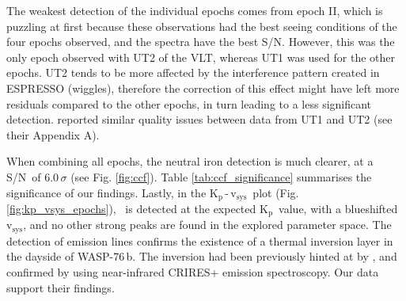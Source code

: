 \documentclass{aa}
\newcommand{\feI}{\ion{Fe}{i}}
\newcommand{\snr}{S/N}
\newcommand{\planet}{WASP-76\,b}
\newcommand{\vsys}{v$_\mathrm{sys}$}
\newcommand{\kpvsys}{K$_\mathrm{p}$\,-\,v$_\mathrm{sys}$}
\newcommand{\kp}{K$_\mathrm{p}$}
\begin{document}
The weakest detection of the individual epochs comes from epoch II, which is puzzling at first because these observations had the best seeing conditions of the four epochs observed, and the spectra have the best \snr. However, this was the only epoch observed with UT2 of the VLT, whereas UT1 was used for the other epochs. UT2 tends to be more affected by the interference pattern created in ESPRESSO (wiggles), therefore the correction of this effect might have left more residuals compared to the other epochs, in turn leading to a less significant detection. \citet{prinoth2023} reported similar quality issues between data from UT1 and UT2 (see their Appendix A).

When combining all epochs, the neutral iron detection is much clearer, at a \snr\ of 6.0\,$\sigma$ (see Fig. \ref{fig:ccf}). Table \ref{tab:ccf_significance} summarises the significance of our findings. Lastly, in the \kpvsys\ plot (Fig. \ref{fig:kp_vsys_epochs}), \feI\ is detected at the expected \kp\ value, with a blueshifted \vsys, and no other strong peaks are found in the explored parameter space.
The detection of emission lines confirms the existence of a thermal inversion layer in the dayside of \planet. The inversion had been previously hinted at by \citet{edwards2020, may2021, fu2021}, and confirmed by \citet{yan2023} using near-infrared CRIRES+ emission spectroscopy. Our data support their findings.
\end{document}
